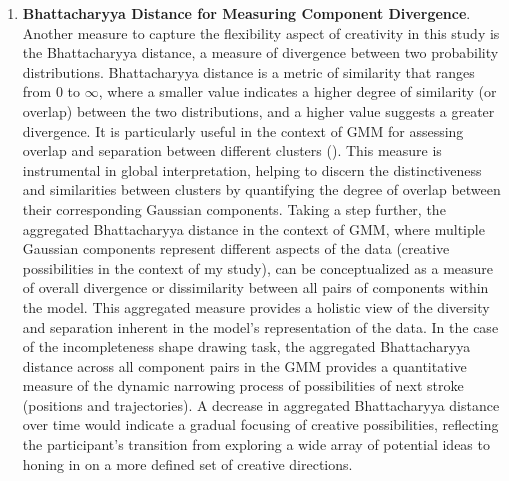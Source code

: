 \documentclass[../Proposal.tex]{subfiles}
\begin{document}
\begin{enumerate}

    
    
    \item \textbf{Bhattacharyya Distance for Measuring Component Divergence}. Another measure to capture the flexibility aspect of creativity in this study is the Bhattacharyya distance, a measure of divergence between two probability distributions. Bhattacharyya distance is a metric of similarity that ranges from 0 to $\infty$, where a smaller value indicates a higher degree of similarity (or overlap) between the two distributions, and a higher value suggests a greater divergence. It is particularly useful in the context of GMM for assessing overlap and separation between different clusters (\cite{alangari_intrinsically_2023}). This measure is instrumental in global interpretation, helping to discern the distinctiveness and similarities between clusters by quantifying the degree of overlap between their corresponding Gaussian components. Taking a step further, the aggregated Bhattacharyya distance in the context of GMM, where multiple Gaussian components represent different aspects of the data (creative possibilities in the context of my study), can be conceptualized as a measure of overall divergence or dissimilarity between all pairs of components within the model. This aggregated measure provides a holistic view of the diversity and separation inherent in the model's representation of the data. In the case of the incompleteness shape drawing task, the aggregated Bhattacharyya distance across all component pairs in the GMM provides a quantitative measure of the dynamic narrowing process of possibilities of next stroke (positions and trajectories). A decrease in aggregated Bhattacharyya distance over time would indicate a gradual focusing of creative possibilities, reflecting the participant's transition from exploring a wide array of potential ideas to honing in on a more defined set of creative directions. 
    

\end{enumerate}
\end{document}
